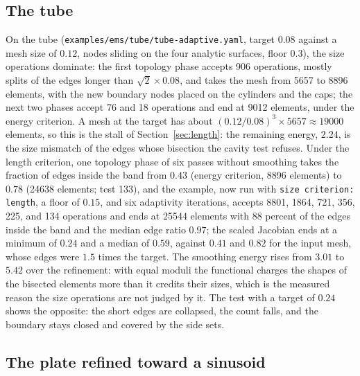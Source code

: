 \documentclass[11pt]{article}
\newcommand{\code}[1]{\texttt{#1}}
\begin{document}
\subsection{The tube}

On the tube (\code{examples/ems/tube/tube-adaptive.yaml}, target $0.08$
against a mesh size of $0.12$, nodes sliding on the four analytic
surfaces, floor $0.3$), the size operations dominate: the first topology
phase accepts 906 operations, mostly splits of the edges longer than
$\sqrt2 \times 0.08$, and takes the mesh from 5657 to 8896 elements, with
the new boundary nodes placed on the cylinders and the caps; the next
two phases accept 76 and 18 operations and end at 9012 elements, under
the energy criterion. A mesh at the target has about $(0.12/0.08)^3
\times 5657 \approx 19000$ elements, so this is the stall of
Section~\ref{sec:length}: the remaining energy, $2.24$, is the size
mismatch of the edges whose bisection the cavity test refuses. Under
the length criterion, one topology phase of six passes without smoothing
takes the fraction of edges inside the band from $0.43$ (energy
criterion, 8896 elements) to $0.78$ (24638 elements; test 133), and the
example, now run with \code{size criterion: length}, a floor of $0.15$,
and six adaptivity iterations, accepts 8801, 1864, 721, 356, 225, and
134 operations and ends at 25544 elements with 88 percent of the edges
inside the band and the median edge ratio $0.97$; the scaled Jacobian
ends at a minimum of $0.24$ and a median of $0.59$, against $0.41$ and
$0.82$ for the input mesh, whose edges were $1.5$ times the target. The
smoothing energy rises from $3.01$ to $5.42$ over the refinement: with
equal moduli the functional charges the shapes of the bisected elements
more than it credits their sizes, which is the measured reason the size
operations are not judged by it. The test with a target of
$0.24$ shows the opposite: the short edges are collapsed, the count
falls, and the boundary stays closed and covered by the side sets.

\subsection{The plate refined toward a sinusoid}
\label{sec:plate}
\end{document}
